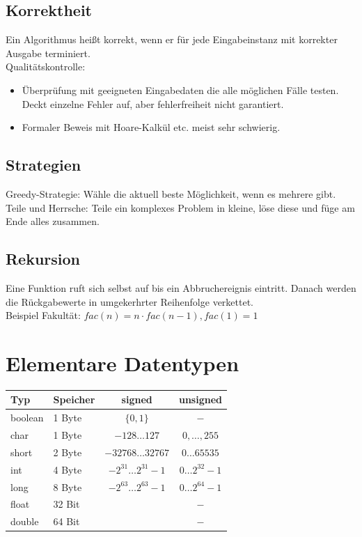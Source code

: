\documentclass[10pt,a4paper]{scrartcl}
\begin{document}
	\subsection{Korrektheit}
	Ein Algorithmus heißt korrekt, wenn er für jede Eingabeinstanz mit korrekter Ausgabe terminiert.\\
	Qualitätskontrolle:\\
	\begin{itemize}\itemsep0pt
		\item Überprüfung mit geeigneten Eingabedaten die alle möglichen Fälle testen. Deckt einzelne Fehler auf, aber fehlerfreiheit nicht garantiert.\\
		\item Formaler Beweis mit Hoare-Kalkül etc. meist sehr schwierig.
	\end{itemize}


	\subsection{Strategien}
	Greedy-Strategie: Wähle die aktuell beste Möglichkeit, wenn es mehrere gibt.\\
	Teile und Herrsche: Teile ein komplexes Problem in kleine, löse diese und füge am Ende alles zusammen.\\


	\subsection{Rekursion}
	Eine Funktion ruft sich selbst auf bis ein Abbruchereignis eintritt. Danach werden die Rückgabewerte in umgekerhrter Reihenfolge verkettet.\\
	Beispiel Fakultät: $fac(n) = n \cdot fac(n-1), fac(1)=1$\\



















\section{Elementare Datentypen}
\begin{tabular}{llcc}
		Typ & Speicher & signed & unsigned \\ \hline
		boolean & 1 Byte & $\{0,1\}$ & $-$ \\
		char & 1 Byte & $-128 \ldots 127$ & $0,\ldots ,255$ \\
		short & 2 Byte & $-32768 \ldots 32767$ & $0 \ldots 65535$\\		
		int & 4 Byte & $-2^{31} \ldots 2^{31}-1$ & $0 \ldots 2^{32}-1$\\ 
		long & 8 Byte & $-2^{63} \ldots 2^{63}-1$ & $0 \ldots 2^{64}-1$\\	
		float & 32 Bit & & $-$\\
		double & 64 Bit & & $-$\\

\end{tabular}
\end{document}
